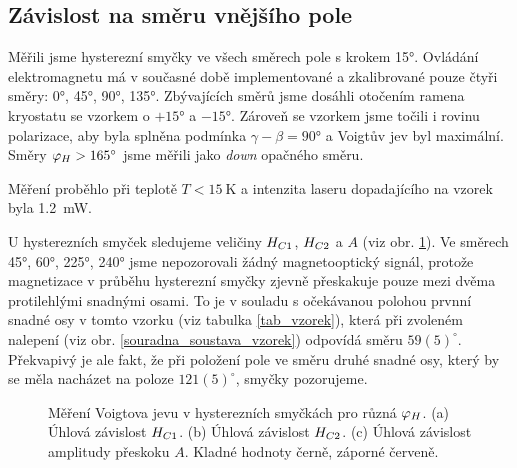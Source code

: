 \subsection{Závislost na směru vnějšího pole} \label{kap_smer}

Měřili jsme hysterezní smyčky ve všech směrech pole s krokem \ang{15}. Ovládání elektromagnetu má v současné době implementované a zkalibrované pouze čtyři směry: \ang{0}, \ang{45}, \ang{90}, \ang{135}. Zbývajících směrů jsme dosáhli otočením ramena kryostatu se vzorkem o $+\ang{15}$ a $-\ang{15}$. Zároveň se vzorkem jsme točili i rovinu polarizace, aby byla splněna podmínka $\gamma-\beta=\ang{90}$ a Voigtův jev byl maximální.
Směry $\varphi_H>\ang{165}$ jsme měřili jako \emph{down} opačného směru.

Měření proběhlo při teplotě $T<\SI{15}{\kelvin}$ a intenzita laseru dopadajícího na vzorek byla \SI{1,2}{\milli\watt}.

U hysterezních smyček sledujeme veličiny $H_{C1}$, $H_{C2}$ a $A$ (viz obr. \ref{kol_okolo}).
Ve směrech \ang{45}, \ang{60}, \ang{225}, \ang{240} jsme nepozorovali žádný magnetooptický signál, protože magnetizace v průběhu hysterezní smyčky zjevně přeskakuje pouze mezi dvěma protilehlými snadnými osami. To je v souladu s očekávanou polohou prvnní snadné osy v tomto vzorku (viz tabulka \ref{tab_vzorek}), která při zvoleném nalepení (viz obr. \ref{souradna_soustava_vzorek}) odpovídá směru $59(5)^\circ$. Překvapivý je ale fakt, že při položení pole ve směru druhé snadné osy, který by se měla nacházet na poloze $121(5)^\circ$, smyčky pozorujeme.

\begin{figure}[htbp]\centering
{}
	\caption{Měření Voigtova jevu v hysterezních smyčkách pro různá $\varphi_H$. (a) Úhlová závislost $H_{C1}$. (b) Úhlová závislost $H_{C2}$. (c) Úhlová závislost amplitudy přeskoku $A$. Kladné hodnoty černě, záporné červeně.}\label{kol_okolo}
\end{figure}

